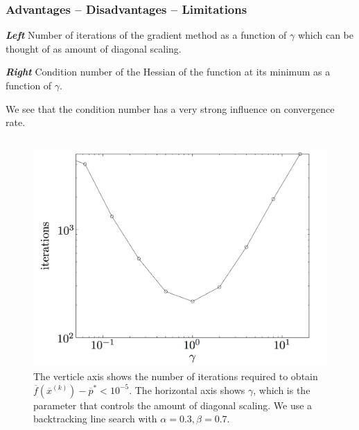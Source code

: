 \begin{frame}
  \frametitle{Advantages -- Disadvantages -- Limitations}

  { \scriptsize   {\bf\it Left} Number of iterations of the gradient method as a
    function of $\gamma$ which can be thought of as amount of diagonal
    scaling.

  {\bf\it Right} Condition number of the Hessian of the function at its
    minimum as a function of $\gamma$.
}
{\scriptsize We see that the condition number has a very strong influence on
convergence rate.}

\begin{columns}
  \begin{column}{0.5\textwidth}
    \begin{figure}[ht!]
      \centering
\includegraphics[scale=0.15]{pics/ga1.png}
\caption{\tiny The
  verticle axis shows the number of iterations required to obtain
  $\overline{f}(\overline{x}^{(k)}) - \overline{p}^* < 10^{-5}$. The
  horizontal axis shows $\gamma$, which is the  parameter that controls the amount of diagonal scaling. We use a
backtracking line search with $\alpha = 0.3, \beta = 0.7$.}
    \end{figure}
  \end{column}


\end{columns}
\end{frame}
